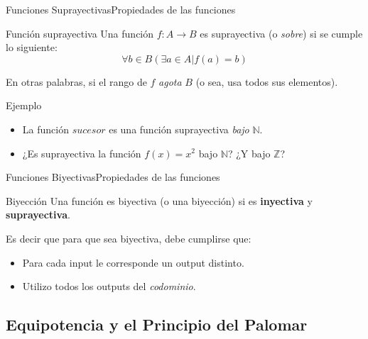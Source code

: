 \documentclass[spanish, c]{beamer}
\begin{document}
\begin{frame}{Funciones Suprayectivas}{Propiedades de las funciones}    

    \begin{block}{Función suprayectiva}
        Una función $f : A \to B$ es suprayectiva (o \textit{sobre}) si se cumple lo siguiente:
        $$\forall b \in B \left(\exists a \in A | f(a) = b \right)$$ 
    \end{block} \pause

    \bigskip

    En otras palabras, si el rango de $f$ \textit{agota} $B$ (o sea, usa todos sus elementos). \pause

    \bigskip

    \begin{exampleblock}{Ejemplo}
        \begin{itemize}
            \item La función $sucesor$ es una función suprayectiva \textit{bajo} $\mathbb{N}$. \pause
            \item ¿Es suprayectiva la función $f(x) = x^2$ bajo $\mathbb{N}$? ¿Y bajo $\mathbb{Z}$?
        \end{itemize}
    \end{exampleblock}

\end{frame}

\begin{frame}{Funciones Biyectivas}{Propiedades de las funciones}

    \begin{block}{Biyección}
        Una función es \alert{biyectiva} (o una biyección) si es \textbf{inyectiva} y \textbf{suprayectiva}.
    \end{block} \pause

    \bigskip

    Es decir que para que sea biyectiva, debe cumplirse que:

    \begin{itemize}
        \item Para cada input le corresponde un output distinto. \pause
        \item Utilizo todos los outputs del \textit{codominio}.
    \end{itemize}
    

\end{frame}

\subsection{Equipotencia y el Principio del Palomar}
\end{document}

